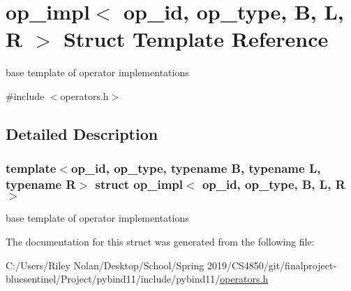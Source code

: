 \hypertarget{structop__impl}{}\section{op\+\_\+impl$<$ op\+\_\+id, op\+\_\+type, B, L, R $>$ Struct Template Reference}
\label{structop__impl}


base template of operator implementations  




{\ttfamily \#include $<$operators.\+h$>$}



\subsection{Detailed Description}
\subsubsection*{template$<$op\+\_\+id, op\+\_\+type, typename B, typename L, typename R$>$\newline
struct op\+\_\+impl$<$ op\+\_\+id, op\+\_\+type, B, L, R $>$}

base template of operator implementations 

The documentation for this struct was generated from the following file\+:\begin{DoxyCompactItemize}
\item 
C\+:/\+Users/\+Riley Nolan/\+Desktop/\+School/\+Spring 2019/\+C\+S4850/git/finalproject-\/bluesentinel/\+Project/pybind11/include/pybind11/\mbox{\hyperlink{operators_8h}{operators.\+h}}\end{DoxyCompactItemize}
